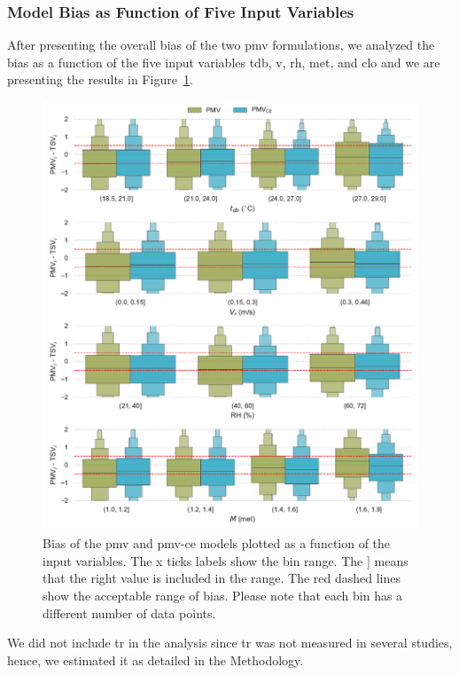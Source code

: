 \subsubsection{Model Bias as Function of Five Input Variables}\label{subsubsec:model-bias-variable}
After presenting the overall bias of the two \ac{pmv} formulations, we analyzed the bias as a function of the five input variables \ac{tdb}, \ac{v}, \ac{rh}, \ac{met}, and \ac{clo} and we are presenting the results in Figure~\ref{fig:bias_models}.
\begin{figure}[htb!]
    \centering
    \includegraphics[width=\textwidth]{figures/bias_models}
    \caption{Bias of the \ac{pmv} and \ac{pmv-ce} models plotted as a function of the input variables.
    The x ticks labels show the bin range.
    The $]$ means that the right value is included in the range.
    The red dashed lines show the acceptable range of bias.
    Please note that each bin has a different number of data points.
    }
    \label{fig:bias_models}
\end{figure}
We did not include \ac{tr} in the analysis since \ac{tr} was not measured in several studies, hence, we estimated it as detailed in the Methodology.
